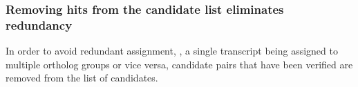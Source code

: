 \subsubsection{Removing hits from the candidate list eliminates redundancy}

In order to avoid redundant assignment, \ie, a single transcript being assigned
to multiple ortholog groups or vice versa, candidate pairs that have been
verified are removed from the list of candidates. 


